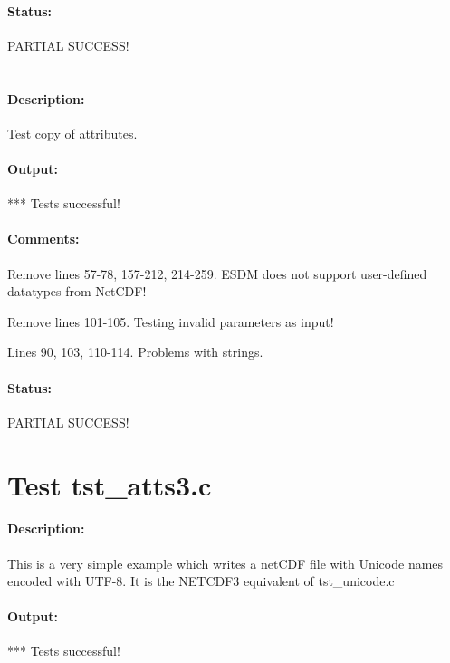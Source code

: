 \paragraph{Status:} PARTIAL SUCCESS!

\section{{\color{blue}{FIX ME! Test tst\_atts2.c}}}

\paragraph{Description:} Test copy of attributes.

\paragraph{Output:} *** Tests successful!

\paragraph{Comments:} Remove lines 57-78, 157-212, 214-259. ESDM does not support user-defined datatypes from NetCDF!

Remove lines 101-105. Testing invalid parameters as input!

Lines 90, 103, 110-114. Problems with strings.



\paragraph{Status:} PARTIAL SUCCESS!

\section{Test tst\_atts3.c}

\paragraph{Description:} This is a very simple example which writes a netCDF file with Unicode names encoded with UTF-8. It is the NETCDF3 equivalent of tst\_unicode.c

\paragraph{Output:} *** Tests successful!

